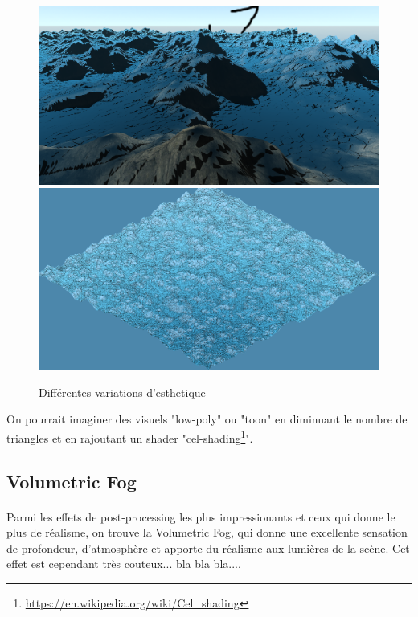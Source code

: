 \documentclass{EPUProjetDi}
\begin{document}
\begin{figure}[ht]
	\centering
	\includegraphics[scale=.205]{esthetics_1}
	\includegraphics[scale=.2]{esthetics_2}
	\caption{Différentes variations d'esthetique}
	\label{fig:esthetics}
\end{figure}

On pourrait imaginer des visuels "low-poly" ou "toon" en diminuant le nombre de triangles et en rajoutant un shader "cel-shading\footnote{\url{https://en.wikipedia.org/wiki/Cel_shading}}".


\subsection{Volumetric Fog}

\paragraph{}
Parmi les effets de post-processing les plus impressionants et ceux qui donne le plus de réalisme, on trouve la Volumetric Fog, qui donne une excellente sensation de profondeur, d'atmosphère et apporte du réalisme aux lumières de la scène.
Cet effet est cependant très couteux... bla bla bla....
\end{document}
